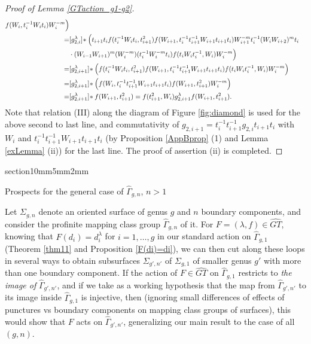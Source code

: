 \documentclass[a4paper,10pt,reqno]{amsart}
\makeatletter
\newcommand\GT{\widehat{GT}}
\newcommand\GGone{\widehat{\Gamma}_{g,1}}
\newcommand\GGn{\widehat{\Gamma}_{g,n}}
\renewcommand{\section}{\@startsection
{section}{1}{0mm}{5mm}{2mm}{\raggedright\bfseries}}
\makeatother
\begin{document}
\begin{proof}[Proof of Lemma \ref{GTaction_g1-g2}]
\begin{align*}
f(W_{i},t_{i}^{-1}W_{i}t_{i})W_{i}^{-m}\Bigr) \\
=&
[g_{2,i}^\lambda]\!\ast\Bigl(
t_{i+1}t_i
f(t_i^{-1}W_it_i,t_{i+1}^2)
f(W_{i+1},t_i^{-1}t_{i+1}^{-1}W_{i+1}t_{i+1}t_i)
W_{i+1}^{-m}
t_i^{-1}(W_iW_{i+2})^m t_i \\
&\cdot
(W_{i-1}W_{i+1})^m(W_{i}^{-m}) (t_{i}^{-1}W_{i}^{-m}t_{i}) 
f(t_iW_{i}t_{i}^{-1},W_{i})W_{i}^{-m}\Bigr) 
\\
=&
[g_{2,i+1}^\lambda]\!\ast\Bigl(
f(t_i^{-1}W_it_i,t_{i+1}^2)
f(W_{i+1},t_i^{-1}t_{i+1}^{-1}W_{i+1}t_{i+1}t_i)
f(t_iW_{i}t_{i}^{-1},W_{i})W_{i}^{-m}\Bigr) \\
=&
[g_{2,i+1}^\lambda]\!\ast\Bigl(
f(W_i,t_i^{-1}t_{i+1}^{-1}W_{i+1}t_{i+1}t_i)
f(W_{i+1},t_{i+1}^2)
W_{i}^{-m}\Bigr)\\
=&
[g_{2,i+1}^\lambda]\!\ast
f(W_{i+1},t_{i+1}^2)
=
f(t_{i+1}^2,W_i)
g_{2,i+1}^\lambda
f(W_{i+1},t_{i+1}^2)
.
\end{align*}
Note that relation (III) along the diagram of
Figure \ref{fig:diamond} is used for the above
second to last line, and commutativity of 
$g_{2,i+1}=t_i^{-1}t_{i+1}^{-1}g_{2,i}t_{i+1}t_i$ with
$W_i$ and $t_i^{-1}t_{i+1}^{-1}W_{i+1}t_{i+1}t_i$ 
(by Proposition \ref{AppBprop} (1) 
and Lemma \ref{exLemma} (ii))
for the last line.
The proof of assertion (ii) is completed. 
\end{proof}

\vspace{.2cm}
\section{Prospects for the general case of $\GGn$, $n>1$}

Let $\Sigma_{g,n}$ denote an oriented surface of genus $g$ and $n$ boundary components,
and consider the profinite mapping class group $\widehat\Gamma_{g,n}$ of it.
For $F=(\lambda, f)\in\GT$, knowing that $F(d_i)=d_i^\lambda$ for 
$i=1,\ldots,g$ in our standard action on $\GGone$ (Theorem \ref{thm11} and
Proposition \ref{F(di)=di}),
we can then cut along these loops in several ways to obtain subsurfaces
$\Sigma_{g',n'}$ of $\Sigma_{g,1}$
of smaller genus $g'$ with more than one boundary component. 
If the action of $F\in \GT$ on $\GGone$ restricts to {\it the image of}
$\widehat\Gamma_{g',n'}$, and if we take as a working hypothesis that the map
from $\widehat\Gamma_{g',n'}$ to its image inside $\GGone$ is injective, then
(ignoring small differences of effects of
punctures vs boundary components on mapping class groups of surfaces),
this would show that $F$ acts on $\widehat\Gamma_{g',n'}$, generalizing our main
result to the case of all $(g,n)$.
\end{document}
